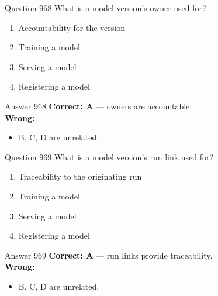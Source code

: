 \documentclass[aspectratio=169,11pt]{beamer}
\begin{document}
	\begin{frame}{Question 968}
		What is a model version's owner used for?
		\begin{enumerate}[label=\Alph*.]
			\item Accountability for the version
			\item Training a model
			\item Serving a model
			\item Registering a model
		\end{enumerate}
	\end{frame}
	\begin{frame}{Answer 968}
		\textbf{Correct: A} --- owners are accountable.\\
		\vspace{0.5em}
		\textbf{Wrong:}
		\begin{itemize}
			\item B, C, D are unrelated.
		\end{itemize}
	\end{frame}
	
	\begin{frame}{Question 969}
		What is a model version's run link used for?
		\begin{enumerate}[label=\Alph*.]
			\item Traceability to the originating run
			\item Training a model
			\item Serving a model
			\item Registering a model
		\end{enumerate}
	\end{frame}
	\begin{frame}{Answer 969}
		\textbf{Correct: A} --- run links provide traceability.\\
		\vspace{0.5em}
		\textbf{Wrong:}
		\begin{itemize}
			\item B, C, D are unrelated.
		\end{itemize}
	\end{frame}
	
\end{document}

